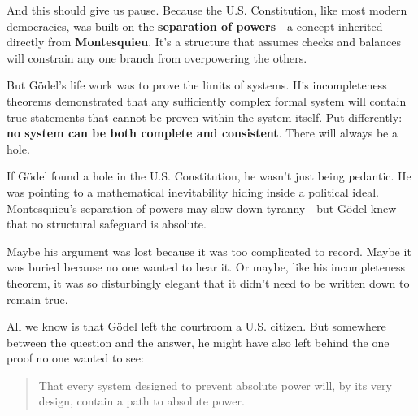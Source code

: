 \begin{tcolorbox}[title=Historical Sidebar: Gödel’s Missing Proof — The Constitutional Loophole That Was Never Written Down, colback=gray!5!white, colframe=black!80!white, breakable, fonttitle=\bfseries]
  \medskip
  
  And this should give us pause. Because the U.S. Constitution, like most modern democracies, was built on the \textbf{separation of powers}—a concept inherited directly from \textbf{Montesquieu}. It’s a structure that assumes checks and balances will constrain any one branch from overpowering the others.  

  \medskip
  
  But Gödel’s life work was to prove the limits of systems. His incompleteness theorems demonstrated that any sufficiently complex formal system will contain true statements that cannot be proven within the system itself. Put differently: \textbf{no system can be both complete and consistent}. There will always be a hole.  

  \medskip
  
  If Gödel found a hole in the U.S. Constitution, he wasn’t just being pedantic. He was pointing to a mathematical inevitability hiding inside a political ideal. Montesquieu’s separation of powers may slow down tyranny—but Gödel knew that no structural safeguard is absolute.  

  \medskip
  
  Maybe his argument was lost because it was too complicated to record. Maybe it was buried because no one wanted to hear it. Or maybe, like his incompleteness theorem, it was so disturbingly elegant that it didn’t need to be written down to remain true.  

  \medskip
  
  All we know is that Gödel left the courtroom a U.S. citizen. But somewhere between the question and the answer, he might have also left behind the one proof no one wanted to see:  

  \begin{quote}
  That every system designed to prevent absolute power will, by its very design, contain a path to absolute power.
  \end{quote}
  
\end{tcolorbox}

